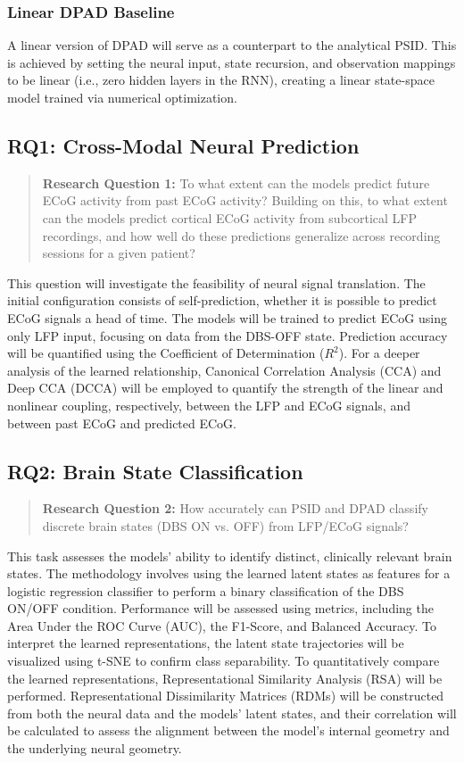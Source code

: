 \documentclass[12pt, a4paper]{article}
\begin{document}
\subsubsection{Linear DPAD Baseline}
A linear version of DPAD will serve as a counterpart to the analytical PSID. This is achieved by setting the neural input, state recursion, and observation mappings to be linear (i.e., zero hidden layers in the RNN), creating a linear state-space model trained via numerical optimization.

\subsection{RQ1: Cross-Modal Neural Prediction}
\begin{quote}
    \textbf{Research Question 1:} To what extent can the models predict future ECoG activity from past ECoG activity? Building on this, to what extent can the models predict cortical ECoG activity from subcortical LFP recordings, and how well do these predictions generalize across recording sessions for a given patient?
\end{quote}

This question will investigate the feasibility of neural signal translation. The initial configuration consists of self-prediction, whether it is possible to predict ECoG signals a head of time. The models will be trained to predict ECoG using only LFP input, focusing on data from the DBS-OFF state. Prediction accuracy will be quantified using the Coefficient of Determination ($R^2$). For a deeper analysis of the learned relationship, Canonical Correlation Analysis (CCA) and Deep CCA (DCCA) will be employed to quantify the strength of the linear and nonlinear coupling, respectively, between the LFP and ECoG signals, and between past ECoG and predicted ECoG.

\subsection{RQ2: Brain State Classification}
\begin{quote}
    \textbf{Research Question 2:} How accurately can PSID and DPAD classify discrete brain states (DBS ON vs. OFF) from LFP/ECoG signals?
\end{quote}

This task assesses the models' ability to identify distinct, clinically relevant brain states. The methodology involves using the learned latent states as features for a logistic regression classifier to perform a binary classification of the DBS ON/OFF condition. Performance will be assessed using metrics, including the Area Under the ROC Curve (AUC), the F1-Score, and Balanced Accuracy. To interpret the learned representations, the latent state trajectories will be visualized using t-SNE to confirm class separability. To quantitatively compare the learned representations, Representational Similarity Analysis (RSA) will be performed. Representational Dissimilarity Matrices (RDMs) will be constructed from both the neural data and the models' latent states, and their correlation will be calculated to assess the alignment between the model's internal geometry and the underlying neural geometry.
\end{document}
